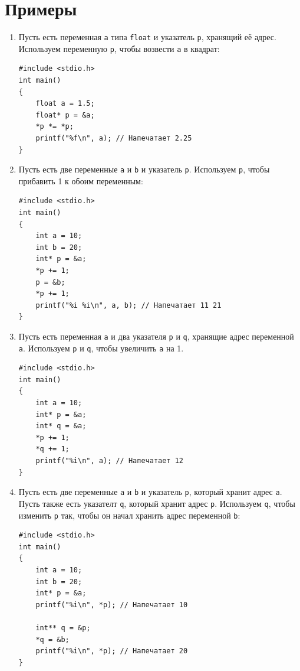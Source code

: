\documentclass{article}
\begin{document}
\section*{Примеры}
\begin{enumerate}

\item Пусть есть переменная \texttt{a} типа \texttt{float} и указатель \texttt{p}, хранящий её адрес. Используем переменную \texttt{p}, чтобы возвести \texttt{a} в квадрат:
\begin{lstlisting}
#include <stdio.h>
int main() 
{
    float a = 1.5;
    float* p = &a;
    *p *= *p;
    printf("%f\n", a); // Напечатает 2.25
}
\end{lstlisting}

\item Пусть есть две переменные \texttt{a} и \texttt{b} и указатель \texttt{p}. Используем \texttt{p}, чтобы прибавить 1 к обоим переменным:
\begin{lstlisting}
#include <stdio.h>
int main() 
{
    int a = 10;
    int b = 20;
    int* p = &a;
    *p += 1;
    p = &b;
    *p += 1;
    printf("%i %i\n", a, b); // Напечатает 11 21
}
\end{lstlisting}

\item Пусть есть переменная \texttt{a} и два указателя \texttt{p} и \texttt{q}, хранящие адрес переменной \texttt{a}. Используем \texttt{p} и \texttt{q}, чтобы увеличить \texttt{a} на 1. 
\begin{lstlisting}
#include <stdio.h>
int main() 
{
    int a = 10;
    int* p = &a;
    int* q = &a;
    *p += 1;
    *q += 1;
    printf("%i\n", a); // Напечатает 12
}
\end{lstlisting}


\item Пусть есть две переменные \texttt{a} и \texttt{b} и указатель \texttt{p}, который хранит адрес \texttt{a}. Пусть также есть указателт \texttt{q}, который хранит адрес \texttt{p}. Используем \texttt{q}, чтобы изменить \texttt{p} так, чтобы он начал хранить адрес переменной \texttt{b}:
\begin{lstlisting}
#include <stdio.h>
int main() 
{
    int a = 10;
    int b = 20;
    int* p = &a;
    printf("%i\n", *p); // Напечатает 10
    
    int** q = &p;
    *q = &b;
    printf("%i\n", *p); // Напечатает 20
}
\end{lstlisting}
\end{enumerate}
\end{document}
